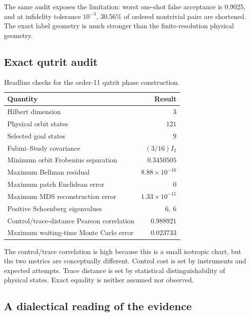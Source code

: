 \documentclass[11pt]{article}
\theoremstyle{definition}
\theoremstyle{remark}
\begin{document}
The same audit exposes the limitation: worst one-shot false acceptance is
0.9025, and at infidelity tolerance $10^{-3}$, 30.56\% of ordered nontrivial
pairs are shortened. The exact label geometry is much stronger than the
finite-resolution physical geometry.

\subsection{Exact qutrit audit}

\begin{table}[t]
\centering
\caption{Headline checks for the order-11 qutrit phase construction.}
\label{tab:qutrit-results}
\begin{tabular}{lr}
\toprule
Quantity & Result\\
\midrule
Hilbert dimension & $3$\\
Physical orbit states & $121$\\
Selected goal states & $9$\\
Fubini--Study covariance & $(3/16)I_2$\\
Minimum orbit Frobenius separation & $0.3450505$\\
Maximum Bellman residual & $8.88\times10^{-16}$\\
Maximum patch Euclidean error & $0$\\
Maximum MDS reconstruction error & $1.33\times10^{-15}$\\
Positive Schoenberg eigenvalues & $6,\ 6$\\
Control/trace-distance Pearson correlation & $0.988921$\\
Maximum waiting-time Monte Carlo error & $0.023733$\\
\bottomrule
\end{tabular}
\end{table}

The control/trace correlation is high because this is a small isotropic chart,
but the two metrics are conceptually different. Control cost is set by
instruments and expected attempts. Trace distance is set by statistical
distinguishability of physical states. Exact equality is neither assumed nor
observed.

\subsection{A dialectical reading of the evidence}
\end{document}
